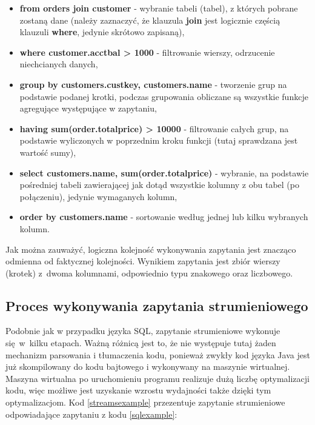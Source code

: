 \documentclass[12pt,twoside,openright]{extarticle}
\begin{document}
\begin{itemize}
    \item \textbf{from orders join customer} - wybranie tabeli (tabel), z których pobrane zostaną dane (należy zaznaczyć, że klauzula \textbf{join} jest logicznie częścią klauzuli \textbf{where}, jedynie skrótowo zapisaną),
    \item \textbf{where customer.acctbal > 1000} - filtrowanie wierszy, odrzucenie niechcianych danych,
    \item \textbf{group by customers.custkey, customers.name} - tworzenie grup na podstawie podanej krotki, podczas grupowania obliczane są wszystkie funkcje agregujące występujące w zapytaniu,
    \item \textbf{having sum(order.totalprice) > 10000} - filtrowanie całych grup, na podstawie wyliczonych w poprzednim kroku funkcji (tutaj sprawdzana jest wartość sumy),
    \item \textbf{select customers.name, sum(order.totalprice)} - wybranie, na podstawie pośredniej tabeli zawierającej jak dotąd wszystkie kolumny z obu tabel (po połączeniu), jedynie wymaganych kolumn,
    \item \textbf{order by customers.name} - sortowanie według jednej lub kilku wybranych kolumn.
\end{itemize}

    Jak można zauważyć, logiczna kolejność wykonywania zapytania jest znacząco odmienna od faktycznej kolejności. Wynikiem zapytania jest zbiór wierszy (krotek) z~dwoma kolumnami, odpowiednio typu znakowego oraz liczbowego.

\subsection{Proces wykonywania zapytania strumieniowego}

    Podobnie jak w przypadku języka SQL, zapytanie strumieniowe wykonuje się w~kilku etapach. Ważną różnicą jest to, że nie występuje tutaj żaden mechanizm parsowania i tłumaczenia kodu, ponieważ zwykły kod języka Java jest już skompilowany do kodu bajtowego i wykonywany na maszynie wirtualnej. Maszyna wirtualna po uruchomieniu programu realizuje dużą liczbę optymalizacji kodu, więc możliwe jest uzyskanie wzrostu wydajności także dzięki tym optymalizacjom. Kod \ref{streamsexample} przezentuje zapytanie strumieniowe odpowiadające zapytaniu z kodu \ref{sqlexample}:
\end{document}
